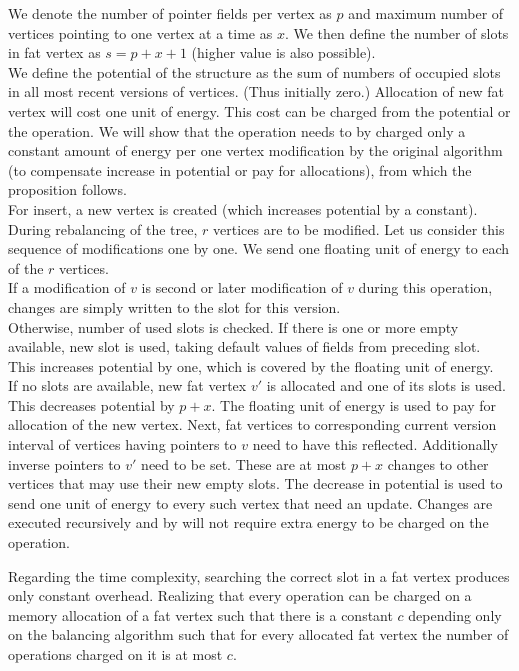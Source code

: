 \begin{myproof}
We denote the number of pointer fields per vertex as $p$ and maximum number of vertices pointing to one vertex at a time as $x$. We then define the number of slots in fat vertex as $s = p + x + 1$ (higher value is also possible).\\
We define the potential of the structure as the sum of numbers of occupied slots in all most recent versions of vertices. (Thus initially zero.) Allocation of new fat vertex will cost one unit of energy. This cost can be charged from the potential or the operation. We will show that the operation needs to by charged only a constant amount of energy per one vertex modification by the original algorithm (to compensate increase in potential or pay for allocations), from which the proposition follows.\\
For insert, a new vertex is created (which increases potential by a constant). During rebalancing of the tree, $r$ vertices are to be modified. Let us consider this sequence of modifications one by one. We send one floating unit of energy to each of the $r$ vertices.\\
If a modification of $v$ is second or later modification of $v$ during this operation, changes are simply written to the slot for this version.\\
Otherwise, number of used slots is checked. If there is one or more empty available, new slot is used, taking default values of fields from preceding slot. This increases potential by one, which is covered by the floating unit of energy.\\
If no slots are available, new fat vertex $v'$ is allocated and one of its slots is used. This decreases potential by $p+x$. The floating unit of energy is used to pay for allocation of the new vertex. Next, fat vertices to corresponding current version interval of vertices having pointers to $v$ need to have this reflected. Additionally inverse pointers to $v'$ need to be set. These are at most $p+x$ changes to other vertices that may use their new empty slots. The decrease in potential is used to send one unit of energy to every such vertex that need an update. Changes are executed recursively and by will not require extra energy to be charged on the operation.
\end{myproof}

Regarding the time complexity, searching the correct slot in a fat vertex produces only constant overhead. Realizing that every operation can be charged on a memory allocation of a fat vertex such that there is a constant $c$ depending only on the balancing algorithm such that for every allocated fat vertex the number of operations charged on it is at most $c$.

